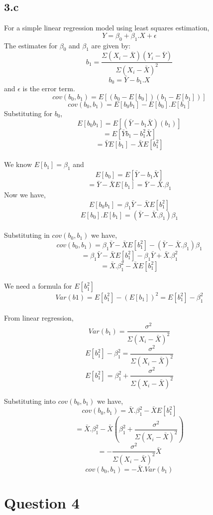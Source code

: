 \documentclass[12pt]{article}
\begin{document}
\subsection*{3.c}
For a simple linear regression model using least squares estimation,
\[Y = \beta_0 + \beta_1 . X + \epsilon\]
The estimates for \(\beta_0\) and \(\beta_1\) are given by:
\[b_1 = \frac{\Sigma(X_i - \bar{X})(Y_i - \bar{Y})}{\Sigma(X_i - \bar{X})^2}\]
\[b_0 = \bar{Y} - b_1.X\]
and \(\epsilon\) is the error term.
\\[\baselineskip]
\[cov(b_0, b_1) = E[(b_0 - E[b_0])(b_1 - E[b_1])]\]
\[cov(b_0, b_1) = E[b_0b_1] - E[b_0].E[b_1]\]
Substituting for \(b_0\),
\[E[b_0 b_1] = E[(\bar{Y} - b_1 \bar{X})(b_1)]\]
\[= E[\bar{Y}b_1 - b_1^2 \bar{X}]\]
\[= \bar{Y} E[b_1] - \bar{X} E[b_1^2]\]
\\
We know \(E[b_1] = \beta_1\) and
\[E[b_0] = E[\bar{Y} - b_1 \bar{X}]\]
\[= \bar{Y} - \bar{X}E[b_1] = \bar{Y} - \bar{X}.\beta_1\]
Now we have,
\[E[b_0 b_1] = \beta_1\bar{Y} - \bar{X} E[b_1^2]\]
\[E[b_0].E[b_1] = (\bar{Y} - \bar{X}.\beta_1)\beta_1\]
\\
Substituting in \(cov(b_0, b_1)\) we have,
\[cov(b_0, b_1) = \beta_1\bar{Y} - \bar{X} E[b_1^2] - (\bar{Y} - \bar{X}.\beta_1)\beta_1\]
\[= \beta_1\bar{Y} - \bar{X} E[b_1^2] - \beta_1\bar{Y} + \bar{X}.\beta_1^2\]
\[= \bar{X}.\beta_1^2 - \bar{X} E[b_1^2]\]
\\
We need a formula for \(E[b_1^2]\)
\[Var(b1) = E[b_1^2] - (E[b_1])^2 = E[b_1^2] - \beta_1^2\]
\\From linear regression,
\[Var(b_1) = \frac{\sigma^2}{\Sigma(X_i - \bar{X})^2}\]
\[E[b_1^2] - \beta_1^2 = \frac{\sigma^2}{\Sigma(X_i - \bar{X})^2}\]
\[E[b_1^2] = \beta_1^2 + \frac{\sigma^2}{\Sigma(X_i - \bar{X})^2}\]

\newpage
Substituting into \(cov(b_0, b_1)\) we have,
\[cov(b_0, b_1) = \bar{X}.\beta_1^2 - \bar{X} E[b_1^2]\]
\[=\bar{X}.\beta_1^2 - \bar{X} (\beta_1^2 + \frac{\sigma^2}{\Sigma(X_i - \bar{X})^2})\]
\[= - \frac{\sigma^2}{\Sigma(X_i - \bar{X})^2}\bar{X}\]
\[cov(b_0, b_1) = -\bar{X}.Var(b_1)\]

\newpage
\section*{Question 4}
\end{document}
